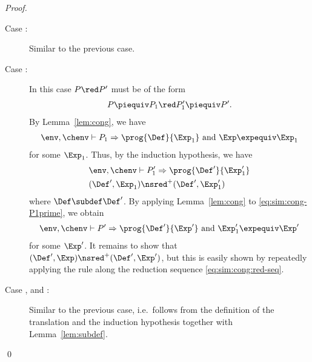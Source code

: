 \begin{proof}
\begin{description}
    \item[Case :]
    Similar to the previous case.

    \item[Case :]
    In this case \( P \red P' \) must be of the form
    \begin{align*}
      P \piequiv P_1 \red P_1' \piequiv P'.
    \end{align*}
    By Lemma~\ref{lem:cong}, we have
    \begin{align*}
      \env, \chenv \vdash P_1 \Rightarrow \prog{\Def}{\Exp_1} \text{ and } \Exp \expequiv \Exp_1
    \end{align*}
    for some \( \Exp_1 \).
    Thus, by the induction hypothesis, we have
    \begin{align}
      &\env, \chenv \vdash P_1' \Rightarrow \prog{\Def'}{\Exp_1'} \label{eq:sim:cong-P1prime}\\
      & (\Def',  \Exp_1) \nsred^+ (\Def', \Exp_1') \label{eq:sim:cong:red-seq}
    \end{align}
    where \( \Def \subdef \Def' \).
    By applying Lemma~\ref{lem:cong} to \eqref{eq:sim:cong-P1prime}, we obtain
    \begin{align*}
      \env, \chenv \vdash P' \Rightarrow \prog{\Def'}{\Exp'} \text{ and } \Exp_1' \expequiv \Exp'
    \end{align*}
    for some \( \Exp' \).
    It remains to show that \( (\Def', \Exp) \nsred^+  (\Def', \Exp') \), but this is easily shown by repeatedly applying the rule  along the reduction sequence \eqref{eq:sim:cong:red-seq}.

    \item[Case ,  and :]
    Similar to the previous case, i.e.~follows from the definition of the translation and the induction hypothesis together with Lemma~\ref{lem:subdef}.
\end{description}







\leavevmode\qed
\end{proof}


